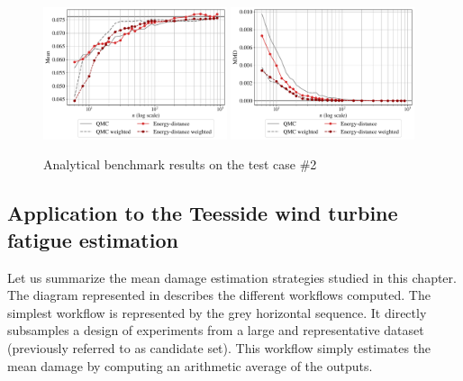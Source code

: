 \begin{figure}[!h]
\begin{center}
    \includegraphics[width=0.48\textwidth]{part2/figures/DCE/analytical_bench/GSobol_10D_(normal_input)_convergence_ED.pdf}
    \includegraphics[width=0.48\textwidth]{part2/figures/DCE/analytical_bench/GSobol_10D_(normal_input)_convergence_MMD_ED.pdf}\\
\end{center}
\caption{Analytical benchmark results on the test case \#2} \label{fig:test case2}
\end{figure}

\subsection{Application to the Teesside wind turbine fatigue estimation}
Let us summarize the mean damage estimation strategies studied in this chapter. 
The diagram represented in  describes the different workflows computed. 
The simplest workflow is represented by the grey horizontal sequence. 
It directly subsamples a design of experiments from a large and representative dataset (previously referred to as candidate set). 
This workflow simply estimates the mean damage by computing an arithmetic average of the outputs. 

